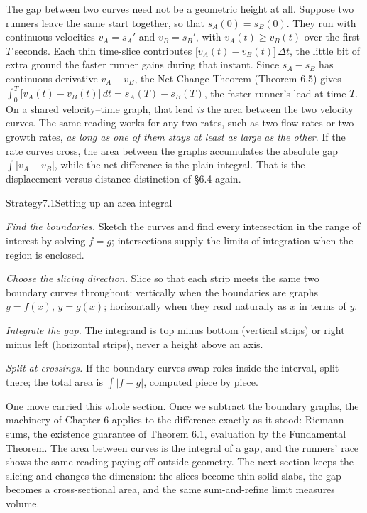 \documentclass[a4paper,12pt,oneside]{memoir}
\begin{document}
The gap between two curves need not be a geometric height at all. Suppose two runners leave the same start together, so that \(s_{A}(0) = s_{B}(0)\). They run with continuous velocities \(v_{A} = s_{A}'\) and \(v_{B} = s_{B}'\), with \(v_{A}(t) \ge v_{B}(t)\) over the first \(T\) seconds. Each thin time-slice contributes \(\bigl[v_{A}(t) - v_{B}(t)\bigr]\,\Delta t\), the little bit of extra ground the faster runner gains during that instant. Since \(s_{A} - s_{B}\) has continuous derivative \(v_{A} - v_{B}\), the Net Change Theorem (Theorem 6.5) gives \(\int_{0}^{T} \bigl[v_{A}(t) - v_{B}(t)\bigr]\,dt = s_{A}(T) - s_{B}(T)\), the faster runner’s lead at time \(T\). On a shared velocity–time graph, that lead \emph{is} the area between the two velocity curves. The same reading works for any two rates, such as two flow rates or two growth rates, \emph{as long as one of them stays at least as large as the other}. If the rate curves cross, the area between the graphs accumulates the absolute gap \(\int \lvert v_{A} - v_{B}\rvert\), while the net difference is the plain integral. That is the displacement-versus-distance distinction of §6.4 again.

\begin{envstrategy}{Strategy}{7.1}{Setting up an area integral}
\begin{steps}
  \item \emph{Find the boundaries.} Sketch the curves and find every intersection in the range of interest by solving \(f = g\); intersections supply the limits of integration when the region is enclosed.
  \item \emph{Choose the slicing direction.} Slice so that each strip meets the same two boundary curves throughout: vertically when the boundaries are graphs \(y = f(x)\), \(y = g(x)\); horizontally when they read naturally as \(x\) in terms of \(y\).
  \item \emph{Integrate the gap.} The integrand is top minus bottom (vertical strips) or right minus left (horizontal strips), never a height above an axis.
  \item \emph{Split at crossings.} If the boundary curves swap roles inside the interval, split there; the total area is \(\int \lvert f - g\rvert\), computed piece by piece.
\end{steps}
\end{envstrategy}
One move carried this whole section. Once we subtract the boundary graphs, the machinery of Chapter 6 applies to the difference exactly as it stood: Riemann sums, the existence guarantee of Theorem 6.1, evaluation by the Fundamental Theorem. The area between curves is the integral of a gap, and the runners’ race shows the same reading paying off outside geometry. The next section keeps the slicing and changes the dimension: the slices become thin solid slabs, the gap becomes a cross-sectional area, and the same sum-and-refine limit measures volume.
\end{document}
